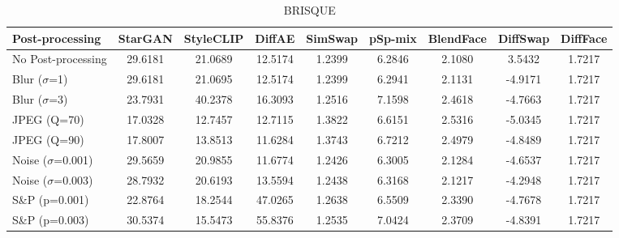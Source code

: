 \documentclass{article}
\begin{document}
\begin{table}[h!]
\begin{subtable}{\textwidth}
\caption{BRISQUE}
\centering
\scriptsize
\begin{tabular}{lcccccccc}
\toprule
\textbf{Post-processing} & StarGAN & StyleCLIP & DiffAE & SimSwap & pSp-mix & BlendFace & DiffSwap & DiffFace \\
\midrule
No Post-processing & 29.6181 & 21.0689 & 12.5174 & 1.2399 & 6.2846 & 2.1080 & 3.5432 & 1.7217 \\
\midrule
Blur ($\sigma$=1) & 29.6181 & 21.0695 & 12.5174 & 1.2399 & 6.2941 & 2.1131 & -4.9171 & 1.7217 \\
Blur ($\sigma$=3) & 23.7931 & 40.2378 & 16.3093 & 1.2516 & 7.1598 & 2.4618 & -4.7663 & 1.7217 \\
JPEG (Q=70) & 17.0328 & 12.7457 & 12.7115 & 1.3822 & 6.6151 & 2.5316 & -5.0345 & 1.7217 \\
JPEG (Q=90) & 17.8007 & 13.8513 & 11.6284 & 1.3743 & 6.7212 & 2.4979 & -4.8489 & 1.7217 \\
Noise ($\sigma$=0.001) & 29.5659 & 20.9855 & 11.6774 & 1.2426 & 6.3005 & 2.1284 & -4.6537 & 1.7217 \\
Noise ($\sigma$=0.003) & 28.7932 & 20.6193 & 13.5594 & 1.2438 & 6.3168 & 2.1217 & -4.2948 & 1.7217 \\
S\&P (p=0.001) & 22.8764 & 18.2544 & 47.0265 & 1.2638 & 6.5509 & 2.3390 & -4.7678 & 1.7217 \\
S\&P (p=0.003) & 30.5374 & 15.5473 & 55.8376 & 1.2535 & 7.0424 & 2.3709 & -4.8391 & 1.7217 \\
\bottomrule
\end{tabular}
\end{subtable}
\end{table}

\clearpage
\end{document}
